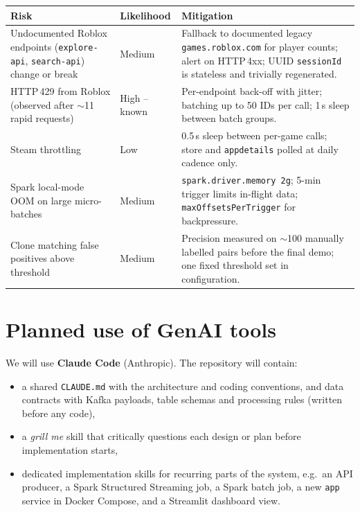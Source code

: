 \documentclass[10pt,a4paper]{article}
\newcommand{\ep}[1]{\texttt{\small #1}}
\begin{document}
{\small
\begin{tabularx}{\textwidth}{L{4.2cm} L{2.0cm} Y}
\toprule
\textbf{Risk} & \textbf{Likelihood} & \textbf{Mitigation}\\
\midrule
Undocumented Roblox endpoints (\ep{explore-api}, \ep{search-api}) change or break & Medium & Fallback to documented legacy \ep{games.roblox.com} for player counts; alert on HTTP\,4xx; UUID \ep{sessionId} is stateless and trivially regenerated.\\
HTTP\,429 from Roblox (observed after ${\sim}$11 rapid requests) & High -- known & Per-endpoint back-off with jitter; batching up to 50 IDs per call; 1\,s sleep between batch groups.\\
Steam throttling & Low & 0.5\,s sleep between per-game calls; store and \ep{appdetails} polled at daily cadence only.\\
Spark local-mode OOM on large micro-batches & Medium & \ep{spark.driver.memory 2g}; 5-min trigger limits in-flight data; \ep{maxOffsetsPerTrigger} for backpressure.\\
Clone matching false positives above threshold & Medium & Precision measured on ${\sim}$100 manually labelled pairs before the final demo; one fixed threshold set in configuration.\\
\bottomrule
\end{tabularx}}

\section{Planned use of GenAI tools}
We will use \textbf{Claude Code} (Anthropic). The repository will contain:
\begin{itemize}
  \item a shared \ep{CLAUDE.md} with the architecture and coding conventions, and data contracts with Kafka payloads, table schemas and processing rules (written before any code),
  \item a \emph{grill me} skill that critically questions each design or plan before implementation starts,
  \item dedicated implementation skills for recurring parts of the system, e.g.\ an API producer, a Spark Structured Streaming job, a Spark batch job, a new \ep{app} service in Docker Compose, and a Streamlit dashboard view.
\end{itemize}
\end{document}
